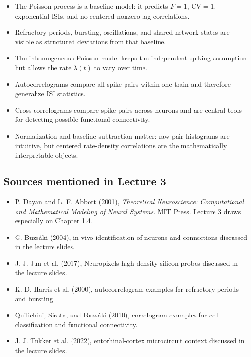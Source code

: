 \documentclass[11pt]{article}
\begin{document}
\begin{itemize}
    \item The Poisson process is a baseline model: it predicts $F=1$, $\mathrm{CV}=1$, exponential ISIs, and no centered nonzero-lag correlations.
    \item Refractory periods, bursting, oscillations, and shared network states are visible as structured deviations from that baseline.
    \item The inhomogeneous Poisson model keeps the independent-spiking assumption but allows the rate $\lambda(t)$ to vary over time.
    \item Autocorrelograms compare all spike pairs within one train and therefore generalize ISI statistics.
    \item Cross-correlograms compare spike pairs across neurons and are central tools for detecting possible functional connectivity.
    \item Normalization and baseline subtraction matter: raw pair histograms are intuitive, but centered rate-density correlations are the mathematically interpretable objects.
\end{itemize}

\subsection*{Sources mentioned in Lecture 3}

\begin{itemize}
    \item P. Dayan and L. F. Abbott (2001), \emph{Theoretical Neuroscience: Computational and Mathematical Modeling of Neural Systems}. MIT Press. Lecture 3 draws especially on Chapter 1.4.
    \item G. Buzs\'aki (2004), in-vivo identification of neurons and connections discussed in the lecture slides.
    \item J. J. Jun et al. (2017), Neuropixels high-density silicon probes discussed in the lecture slides.
    \item K. D. Harris et al. (2000), autocorrelogram examples for refractory periods and bursting.
    \item Quilichini, Sirota, and Buzs\'aki (2010), correlogram examples for cell classification and functional connectivity.
    \item J. J. Tukker et al. (2022), entorhinal-cortex microcircuit context discussed in the lecture slides.
\end{itemize}
\end{document}
